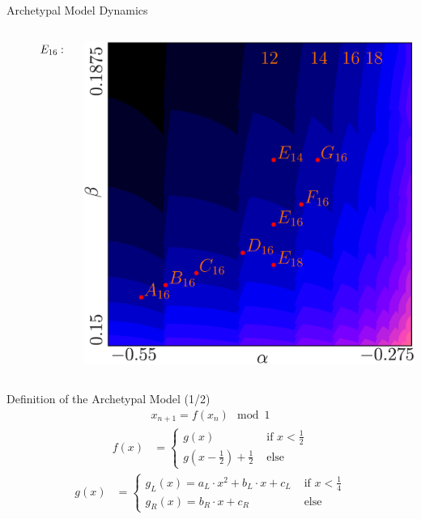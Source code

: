 \begin{frame}{Archetypal Model Dynamics}
{\begin{columns}
\begin{column}{.9 \textwidth}
\begin{figure}
{					}{$E_{16}:\:\mathcal{O}_{\mathcal{A}^5\mathcal{B}^3\mathcal{C}^5\mathcal{D}^3}$}
				\end{figure}
			\end{column}
			\begin{column}{.2 \textwidth}
				\vspace{-4em}
				\begin{center}
					\hspace{-2em}
					\includegraphics[height=0.3 \textheight]{../Figures/6/6.1a/result.png}
				\end{center}
			\end{column}
		\end{columns}
	}
\end{frame}

\begin{frame}{Definition of the Archetypal Model (1/2)}
	\vspace{-1.0em}
	\begin{align*}
		x_{n+1} = f(x_n) \mod 1
	\end{align*}
	\begin{align*}
		f(x) & = \begin{cases}
			         g(x)                                        & \text{ if } x < \frac{1}{2} \\
			         g\left(x - \frac{1}{2}\right) + \frac{1}{2} & \text{ else}
		         \end{cases}
	\end{align*}
	\begin{align*}
		g(x) & = \begin{cases}
			         g_L(x) = a_L \cdot x^2 + b_L \cdot x + c_L & \text{ if } x < \frac{1}{4} \\
			         g_R(x) = b_R \cdot x + c_R                 & \text{ else}
		         \end{cases}
	\end{align*}
\end{frame}

